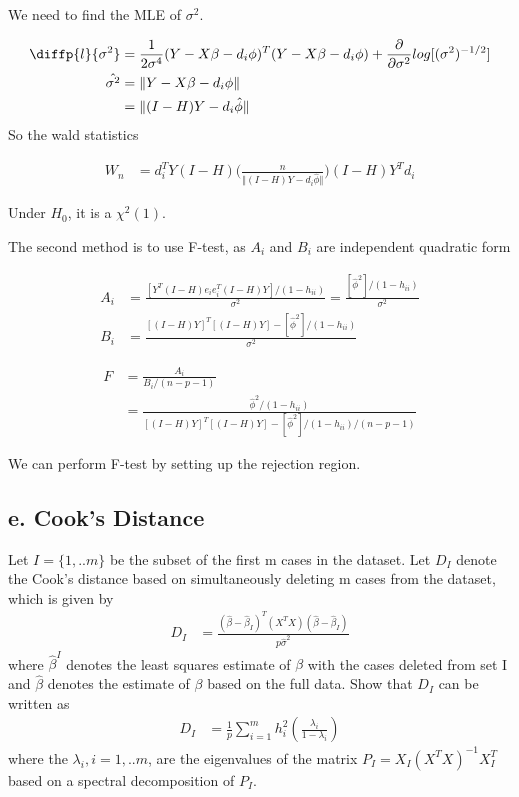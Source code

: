 We need to find the MLE of $\sigma^2$.

\begin{align*}
	\diffp{l}{{\sigma^2}} &= \frac{1}{2 \sigma^4} (Y- X\beta -d_i \phi)^T (Y- X\beta -d_i \phi) +
	\frac{\partial}{\partial \sigma^2} log [(\sigma^2)^{-1/2}] \\
	\hat{\sigma^2} &= \Vert Y- X \beta -d_i \phi \Vert \\
	&= \Vert (I-H)Y -d_i \hat{\phi} \Vert
\end{align*}
So the wald statistics

\begin{align*}
	W_n &= d_i^T Y(I-H) \Bigg( \frac{n}{ \Vert (I-H)Y -d_i \hat{\phi} \Vert} \Bigg) (I-H) Y^T d_i
\end{align*}

Under $H_0$, it is a $\chi^2(1)$. 



The second method is to use F-test, as $A_i$ and $B_i$ are independent quadratic form 

\begin{align*}
	A_i & = \frac{ [Y^T (I-H) e_i e_i^T (I-H) Y]/(1-h_{ii})}{\sigma^2} = \frac{ [\hat{\phi}^2]/(1-h_{ii})}{\sigma^2}\\
	B_i &=  \frac{ [(I-H)Y ]^T[(I-H)Y ]- [\hat{\phi}^2]/(1-h_{ii})}{\sigma^2} 
\end{align*} 

\begin{align*}
	F &= \frac{A_i}{B_i/(n-p-1)} \\
	&= \frac{\hat{\phi}^2/(1-h_{ii})}{[(I-H)Y ]^T[(I-H)Y ]- [\hat{\phi}^2]/(1-h_{ii})/(n-p-1)} 
\end{align*}

We can perform F-test by setting up the rejection region.

\subsection{e. Cook's Distance}
 Let $I = \{ 1,.. m\}$ be the subset of the first m cases in the dataset. Let $D_I$ denote the Cook's distance based on simultaneously deleting m cases from the dataset, which is given by
\begin{align*}
	D_I & = \frac{(\hat{\beta} - \hat{\beta}_I)^T (X^T X) (\hat{\beta} - \hat{\beta}_I)}{p \hat{\sigma}^2}
\end{align*} 
where $\hat{\beta}^I$ denotes the least squares estimate of $\beta$ with the cases deleted from set I and $\hat{\beta}$ denotes the estimate of $\beta$ based on the full data. Show that $D_I$ can be written as 
\begin{align*}
	D_I & = \frac{1}{p} \sum_{i=1}^m h_i^2 \left( \frac{\lambda_i}{1- \lambda_i} \right)
\end{align*} 	
where the $\lambda_i, i=1,..m$, are the eigenvalues of the matrix $P_I = X_I (X^T X)^{-1} X_I^T$ based on a spectral decomposition of $P_I$.
 
